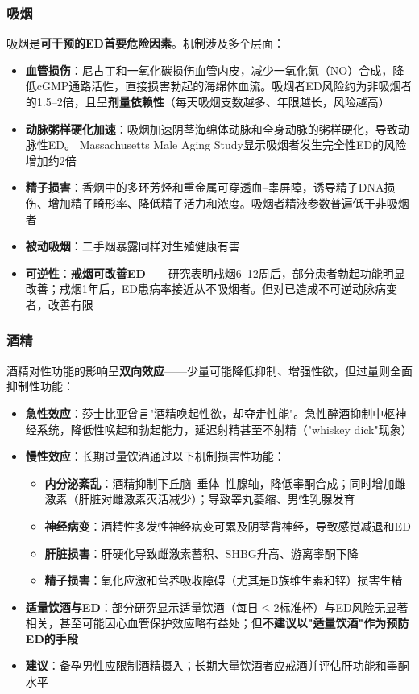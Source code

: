 \begin{enumerate}
\subsubsection{吸烟}

吸烟是\textbf{可干预的ED首要危险因素}。机制涉及多个层面：

\begin{itemize}[leftmargin=2cm]
	\item \textbf{血管损伤}：尼古丁和一氧化碳损伤血管内皮，减少一氧化氮（NO）合成，降低cGMP通路活性，直接损害勃起的海绵体血流。吸烟者ED风险约为非吸烟者的1.5--2倍，且呈\textbf{剂量依赖性}（每天吸烟支数越多、年限越长，风险越高）
	\item \textbf{动脉粥样硬化加速}：吸烟加速阴茎海绵体动脉和全身动脉的粥样硬化，导致动脉性ED。 Massachusetts Male Aging Study显示吸烟者发生完全性ED的风险增加约2倍
	\item \textbf{精子损害}：香烟中的多环芳烃和重金属可穿透血--睾屏障，诱导精子DNA损伤、增加精子畸形率、降低精子活力和浓度。吸烟者精液参数普遍低于非吸烟者
	\item \textbf{被动吸烟}：二手烟暴露同样对生殖健康有害
	\item \textbf{可逆性}：\textbf{戒烟可改善ED}——研究表明戒烟6--12周后，部分患者勃起功能明显改善；戒烟1年后，ED患病率接近从不吸烟者。但对已造成不可逆动脉病变者，改善有限
\end{itemize}

\subsubsection{酒精}

酒精对性功能的影响呈\textbf{双向效应}——少量可能降低抑制、增强性欲，但过量则全面抑制性功能：

\begin{itemize}[leftmargin=2cm]
	\item \textbf{急性效应}：莎士比亚曾言"酒精唤起性欲，却夺走性能"。急性醉酒抑制中枢神经系统，降低性唤起和勃起能力，延迟射精甚至不射精（"whiskey dick"现象）
	\item \textbf{慢性效应}：长期过量饮酒通过以下机制损害性功能：
    \begin{itemize}
    	\item \textbf{内分泌紊乱}：酒精抑制下丘脑--垂体--性腺轴，降低睾酮合成；同时增加雌激素（肝脏对雌激素灭活减少）；导致睾丸萎缩、男性乳腺发育
    	\item \textbf{神经病变}：酒精性多发性神经病变可累及阴茎背神经，导致感觉减退和ED
    	\item \textbf{肝脏损害}：肝硬化导致雌激素蓄积、SHBG升高、游离睾酮下降
    	\item \textbf{精子损害}：氧化应激和营养吸收障碍（尤其是B族维生素和锌）损害生精
    \end{itemize}
	\item \textbf{适量饮酒与ED}：部分研究显示适量饮酒（每日$\le$2标准杯）与ED风险无显著相关，甚至可能因心血管保护效应略有益处；但\textbf{不建议以"适量饮酒"作为预防ED的手段}
	\item \textbf{建议}：备孕男性应限制酒精摄入；长期大量饮酒者应戒酒并评估肝功能和睾酮水平
\end{itemize}


\end{enumerate}
